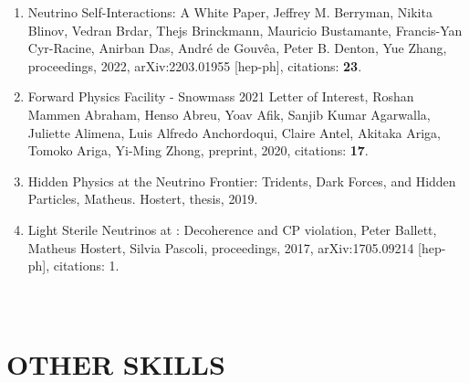 \documentclass[a4paper,10pt]{article}
\begin{document}
\begin{enumerate}
\item Neutrino Self-Interactions: A White Paper, Jeffrey M. Berryman, Nikita Blinov, Vedran Brdar, Thejs Brinckmann, Mauricio Bustamante, Francis-Yan Cyr-Racine, Anirban Das, André de Gouvêa, Peter B. Denton, Yue Zhang, proceedings, 2022, arXiv:2203.01955 [hep-ph], citations: \textbf{23}.
\item Forward Physics Facility - Snowmass 2021 Letter of Interest, Roshan Mammen Abraham, Henso Abreu, Yoav Afik, Sanjib Kumar Agarwalla, Juliette Alimena, Luis Alfredo Anchordoqui, Claire Antel, Akitaka Ariga, Tomoko Ariga, Yi-Ming Zhong, preprint, 2020, citations: \textbf{17}.
\item Hidden Physics at the Neutrino Frontier: Tridents, Dark Forces, and Hidden Particles, Matheus. Hostert, thesis, 2019.
\item Light Sterile Neutrinos at \nuSTORM: Decoherence and CP violation, Peter Ballett, Matheus Hostert, Silvia Pascoli, proceedings, 2017, arXiv:1705.09214 [hep-ph], citations: 1.
\end{enumerate}


\section{\\OTHER SKILLS}


\end{document}
